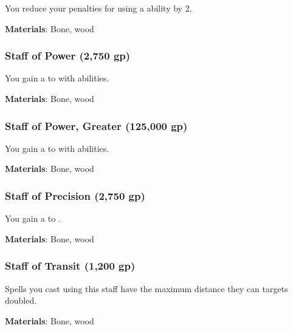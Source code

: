 You reduce your penalties for using a  ability by 2.



\vspace{0.25em}
\textbf{Materials}: Bone, wood


\lowercase{\hypertarget{item:Staff of Power}{}}\label{item:Staff of Power}
\hypertarget{item:Staff of Power}{\subsubsection{Staff of Power\hfill{} (2,750 gp)}}

You gain a   to  with  abilities.



\vspace{0.25em}
\textbf{Materials}: Bone, wood


\lowercase{\hypertarget{item:Staff of Power, Greater}{}}\label{item:Staff of Power, Greater}
\hypertarget{item:Staff of Power, Greater}{\subsubsection{Staff of Power, Greater\hfill{} (125,000 gp)}}

You gain a   to  with  abilities.



\vspace{0.25em}
\textbf{Materials}: Bone, wood


\lowercase{\hypertarget{item:Staff of Precision}{}}\label{item:Staff of Precision}
\hypertarget{item:Staff of Precision}{\subsubsection{Staff of Precision\hfill{} (2,750 gp)}}

You gain a   to .



\vspace{0.25em}
\textbf{Materials}: Bone, wood


\lowercase{\hypertarget{item:Staff of Transit}{}}\label{item:Staff of Transit}
\hypertarget{item:Staff of Transit}{\subsubsection{Staff of Transit\hfill{} (1,200 gp)}}

Spells you cast using this staff have the maximum distance they can  targets doubled.



\vspace{0.25em}
\textbf{Materials}: Bone, wood
